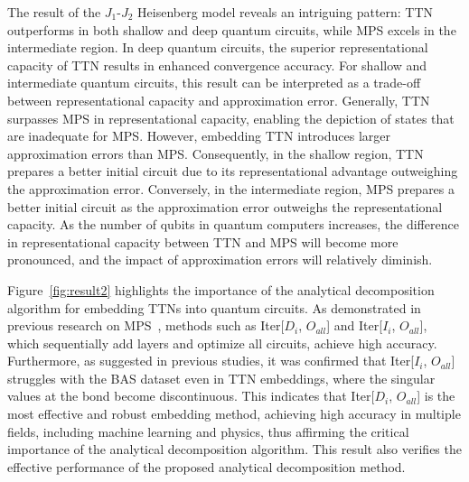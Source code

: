 \documentclass[12pt,dvipdfmx,twoside,openright]{report}
\begin{document}
The result of the $J_1$-$J_2$ Heisenberg model reveals an intriguing pattern: TTN outperforms in both shallow and deep quantum circuits, while MPS excels in the intermediate region.
In deep quantum circuits, the superior representational capacity of TTN results in enhanced convergence accuracy.
For shallow and intermediate quantum circuits, this result can be interpreted as a trade-off between representational capacity and approximation error.
Generally, TTN surpasses MPS in representational capacity, enabling the depiction of states that are inadequate for MPS.
However, embedding TTN introduces larger approximation errors than MPS. 
Consequently, in the shallow region, TTN prepares a better initial circuit due to its representational advantage outweighing the approximation error.
Conversely, in the intermediate region, MPS prepares a better initial circuit as the approximation error outweighs the representational capacity. 
As the number of qubits in quantum computers increases, the difference in representational capacity between TTN and MPS will become more pronounced, and the impact of approximation errors will relatively diminish.

Figure~\ref{fig:result2} highlights the importance of the analytical decomposition algorithm for embedding TTNs into quantum circuits.
As demonstrated in previous research on MPS~\cite{mpsdecomp}, methods such as Iter[$D_i$, $O_{all}$] and Iter[$I_i$, $O_{all}$], which sequentially add layers and optimize all circuits, achieve high accuracy. 
Furthermore, as suggested in previous studies, it was confirmed that Iter[$I_i$, $O_{all}$] struggles with the BAS dataset even in TTN embeddings, where the singular values at the bond become discontinuous. 
This indicates that Iter[$D_i$, $O_{all}$] is the most effective and robust embedding method, achieving high accuracy in multiple fields, including machine learning and physics, thus affirming the critical importance of the analytical decomposition algorithm.
This result also verifies the effective performance of the proposed analytical decomposition method.





\cleardoublepage
\end{document}
